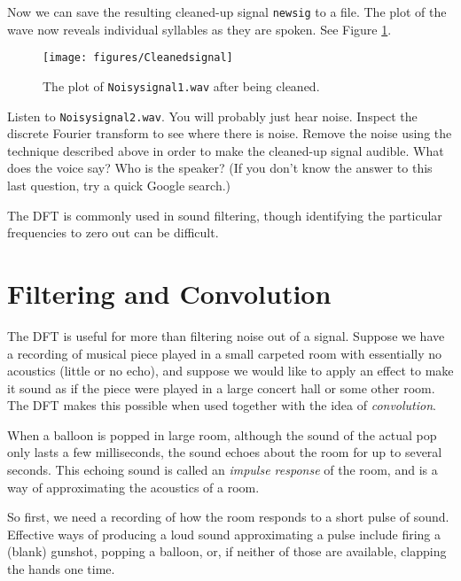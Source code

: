 Now we can save the resulting cleaned-up signal \texttt{newsig} to a  file.
The plot of the wave now reveals individual syllables as they are spoken.
See Figure \ref{fig:cleansignal}.

\begin{figure}
\centering
\texttt{[image: figures/Cleanedsignal]}
\caption{The plot of \texttt{Noisysignal1.wav} after being cleaned.}
\label{fig:cleansignal}
\end{figure}

\begin{problem}
Listen to \texttt{Noisysignal2.wav}.
You will probably just hear noise.
Inspect the discrete Fourier transform to see where there is noise.
Remove the noise using the technique described above in order to make the cleaned-up signal audible.
What does the voice say?
Who is the speaker?
(If you don't know the answer to this last question, try a quick Google search.)
\end{problem}

The DFT is commonly used in sound filtering, though identifying the particular frequencies to zero out can be difficult.

\section*{Filtering and Convolution}

The DFT is useful for more than filtering noise out of a signal.
Suppose we have a recording of musical piece played in a small carpeted room with essentially no acoustics (little or no echo), and suppose we would like to apply an effect to make it sound as if the piece were played in a large concert hall or some other room.
The DFT makes this possible when used together with the idea of \emph{convolution}.

When a balloon is popped in large room, although the sound of the actual pop only lasts a few milliseconds, the sound echoes about the room for up to several seconds.
This echoing sound is called an \emph{impulse response} of the room, and is a way of approximating the acoustics of a room.

So first, we need a recording of how the room responds to a short pulse of sound.
Effective ways of producing a loud sound approximating a pulse include firing a (blank) gunshot, popping a balloon, or, if neither of those are available, clapping the hands one time.

